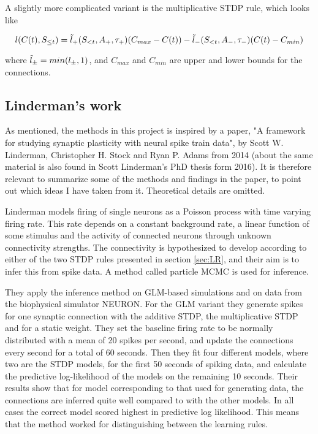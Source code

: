 A slightly more complicated variant is the multiplicative STDP rule, which looks like

\begin{equation}
    l(C(t), S_{\leq t}) = \Tilde{l}_+(S_{<t}, A_+,\tau_+)(C_{max} - C(t))  - \Tilde{l}_-(S_{<t}, A_-,\tau_-)(C(t) - C_{min})
\end{equation}

where $\Tilde{l}_{\pm} = min(l_{\pm},1)$, and $C_{max}$ and $C_{min}$ are upper and lower bounds for the connections. 

\subsection{Linderman's work}
\label{Linderman}
As mentioned, the methods in this project is inspired by a paper, "A framework for studying synaptic plasticity with neural spike train data", by Scott W. Linderman, Christopher H. Stock and Ryan P. Adams from 2014 (about the same material is also found in Scott Linderman's PhD thesis form 2016). It is therefore relevant to summarize some of the methods and findings in the paper, to point out which ideas I have taken from it. Theoretical details are omitted.

Linderman models firing of single neurons as a Poisson process with time varying firing rate. This rate depends on a constant background rate, a linear function of some stimulus and the activity of connected neurons through unknown connectivity strengths. The connectivity is hypothesized to develop according to either of the two STDP rules presented in section \ref{sec:LR}, and their aim is to infer this from spike data. A method called particle MCMC is used for inference. 

They apply the inference method on GLM-based simulations and on data from the biophysical simulator NEURON. For the GLM variant they generate spikes for one synaptic connection with the additive STDP, the multiplicative STDP and for a static weight. They set the baseline firing rate to be normally distributed with a mean of 20 spikes per second, and update the connections every second for a total of 60 seconds. Then they fit four different models, where two are the STDP models, for the first 50 seconds of spiking data, and calculate the predictive log-likelihood of the models on the remaining 10 seconds. Their results show that for model corresponding to that used for generating data, the connections are inferred quite well compared to with the other models. In all cases the correct model scored highest in predictive log likelihood. This means that the method worked for distinguishing between the learning rules.













\cleardoublepage